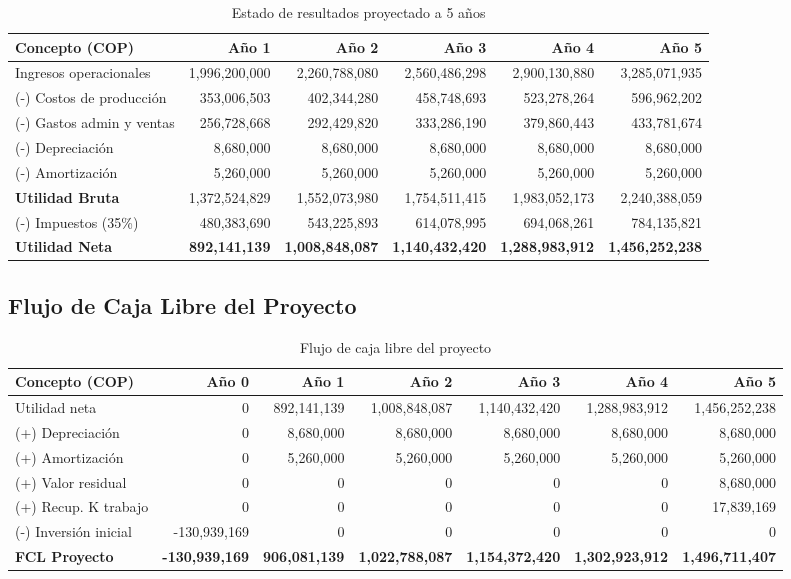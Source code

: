 \begin{table}[H]
\centering
\small
\begin{tabular}{lrrrrr}
\toprule
\textbf{Concepto (COP)} & \textbf{Año 1} & \textbf{Año 2} & \textbf{Año 3} & \textbf{Año 4} & \textbf{Año 5} \\
\midrule
Ingresos operacionales & 1,996,200,000 & 2,260,788,080 & 2,560,486,298 & 2,900,130,880 & 3,285,071,935 \\
(-) Costos de producción & 353,006,503 & 402,344,280 & 458,748,693 & 523,278,264 & 596,962,202 \\
(-) Gastos admin y ventas & 256,728,668 & 292,429,820 & 333,286,190 & 379,860,443 & 433,781,674 \\
(-) Depreciación & 8,680,000 & 8,680,000 & 8,680,000 & 8,680,000 & 8,680,000 \\
(-) Amortización & 5,260,000 & 5,260,000 & 5,260,000 & 5,260,000 & 5,260,000 \\
\midrule
\textbf{Utilidad Bruta} & 1,372,524,829 & 1,552,073,980 & 1,754,511,415 & 1,983,052,173 & 2,240,388,059 \\
(-) Impuestos (35\%) & 480,383,690 & 543,225,893 & 614,078,995 & 694,068,261 & 784,135,821 \\
\midrule
\textbf{Utilidad Neta} & \textbf{892,141,139} & \textbf{1,008,848,087} & \textbf{1,140,432,420} & \textbf{1,288,983,912} & \textbf{1,456,252,238} \\
\bottomrule
\end{tabular}
\caption{Estado de resultados proyectado a 5 años}
\end{table}

\subsection{Flujo de Caja Libre del Proyecto}

\begin{table}[H]
\centering
\small
\begin{tabular}{lrrrrrr}
\toprule
\textbf{Concepto (COP)} & \textbf{Año 0} & \textbf{Año 1} & \textbf{Año 2} & \textbf{Año 3} & \textbf{Año 4} & \textbf{Año 5} \\
\midrule
Utilidad neta & 0 & 892,141,139 & 1,008,848,087 & 1,140,432,420 & 1,288,983,912 & 1,456,252,238 \\
(+) Depreciación & 0 & 8,680,000 & 8,680,000 & 8,680,000 & 8,680,000 & 8,680,000 \\
(+) Amortización & 0 & 5,260,000 & 5,260,000 & 5,260,000 & 5,260,000 & 5,260,000 \\
(+) Valor residual & 0 & 0 & 0 & 0 & 0 & 8,680,000 \\
(+) Recup. K trabajo & 0 & 0 & 0 & 0 & 0 & 17,839,169 \\
(-) Inversión inicial & -130,939,169 & 0 & 0 & 0 & 0 & 0 \\
\midrule
\textbf{FCL Proyecto} & \textbf{-130,939,169} & \textbf{906,081,139} & \textbf{1,022,788,087} & \textbf{1,154,372,420} & \textbf{1,302,923,912} & \textbf{1,496,711,407} \\
\bottomrule
\end{tabular}
\caption{Flujo de caja libre del proyecto}
\end{table}


